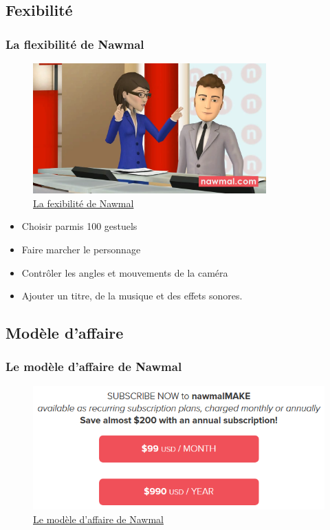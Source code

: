 																														\subsection{Fexibilité} 
		\begin{frame}[allowframebreaks]
			\frametitle{La flexibilité de Nawmal}
			\begin{figure}
			\centering
                     \includegraphics[width = 0.8\textwidth]{nawmalflexibilite.png}
                     \caption{\tiny{\href{run:nawmalflexibilite.png}{La fexibilité de Nawmal}}}
                   \end{figure}
			\framebreak
			\begin {itemize}
				\item Choisir parmis 100 gestuels
				\item Faire marcher le personnage
				\item Contrôler les angles et mouvements de la caméra
				\item Ajouter un titre, de la musique et des effets sonores.
				

			\end{itemize}
			
			\end{frame}	
			
																														\subsection{Modèle d'affaire} 
		\begin{frame}[allowframebreaks]
			\frametitle{Le modèle d'affaire de Nawmal}
			\begin{figure}
			\centering
                     \includegraphics[width = 1\textwidth]{nawmalmodeleaffaire.png}
                     \caption{\tiny{\href{run:nawmalmodeleaffaire.png}{Le modèle d'affaire de Nawmal}}}
                   \end{figure}
		
			\end{frame}		
			
